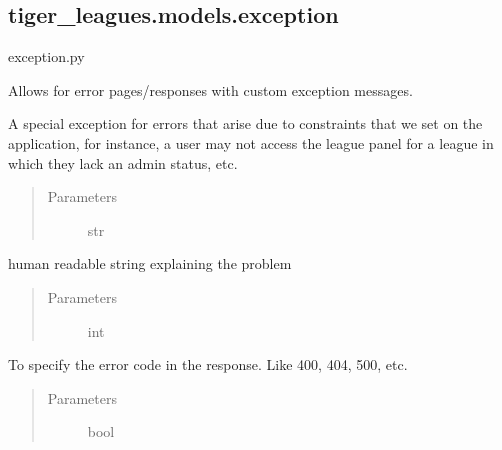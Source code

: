 \documentclass[letterpaper,10pt,english]{sphinxmanual}
\begin{document}
\subsection{tiger\_leagues.models.exception}
\label{\detokenize{tiger_leagues/models/readme:module-tiger_leagues.models.exception}}\label{\detokenize{tiger_leagues/models/readme:tiger-leagues-models-exception}}
exception.py

Allows for error pages/responses with custom exception messages.

\begin{fulllineitems}
\label{\detokenize{tiger_leagues/models/readme:tiger_leagues.models.exception.TigerLeaguesException}}
A special exception for errors that arise due to constraints that we set on 
the application, for instance, a user may not access the league panel for a 
league in which they lack an admin status, etc.
\begin{quote}\begin{description}
\item[{Parameters}] \leavevmode
{} \textendash{} str

\end{description}\end{quote}

human readable string explaining the problem
\begin{quote}\begin{description}
\item[{Parameters}] \leavevmode
{} \textendash{} int

\end{description}\end{quote}

To specify the error code in the response. Like 400, 404, 500, etc.
\begin{quote}\begin{description}
\item[{Parameters}] \leavevmode
{} \textendash{} bool


\end{description}
\end{quote}
\end{fulllineitems}
\end{document}
